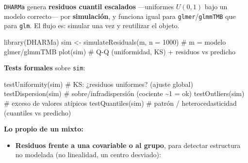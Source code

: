 \documentclass[
  letterpaper,
  DIV=11,
  numbers=noendperiod]{scrartcl}
\newenvironment{Shaded}{\begin{snugshade}}{\end{snugshade}}
\newcommand{\AttributeTok}[1]{\textcolor[rgb]{0.40,0.45,0.13}{#1}}
\newcommand{\CommentTok}[1]{\textcolor[rgb]{0.37,0.37,0.37}{#1}}
\newcommand{\DecValTok}[1]{\textcolor[rgb]{0.68,0.00,0.00}{#1}}
\newcommand{\FunctionTok}[1]{\textcolor[rgb]{0.28,0.35,0.67}{#1}}
\newcommand{\NormalTok}[1]{\textcolor[rgb]{0.00,0.23,0.31}{#1}}
\newcommand{\OtherTok}[1]{\textcolor[rgb]{0.00,0.23,0.31}{#1}}
\providecommand{\tightlist}{%
  \setlength{\itemsep}{0pt}\setlength{\parskip}{0pt}}\usepackage{longtable,booktabs,array}
\begin{document}
\begin{tcolorbox}[enhanced jigsaw, breakable, colframe=quarto-callout-tip-color-frame, left=2mm, arc=.35mm, colbacktitle=quarto-callout-tip-color!10!white, toprule=.15mm, colback=white, coltitle=black, rightrule=.15mm, opacitybacktitle=0.6, title=\textcolor{quarto-callout-tip-color}{\faLightbulb}\hspace{0.5em}{🔧 En R. Residuos simulados (DHARMa) en modelos mixtos}, titlerule=0mm, toptitle=1mm, bottomtitle=1mm, leftrule=.75mm, bottomrule=.15mm, opacityback=0]

\texttt{DHARMa} genera \textbf{residuos cuantil escalados} ---uniformes
\(U(0,1)\) bajo un modelo correcto--- por \textbf{simulación}, y
funciona igual para \texttt{glmer}/\texttt{glmmTMB} que para
\texttt{glm}. El flujo es: simular una vez y reutilizar el objeto.

\begin{Shaded}
\begin{Highlighting}[]
\FunctionTok{library}\NormalTok{(DHARMa)}
\NormalTok{sim }\OtherTok{\textless{}{-}} \FunctionTok{simulateResiduals}\NormalTok{(m, }\AttributeTok{n =} \DecValTok{1000}\NormalTok{)   }\CommentTok{\# m = modelo glmer/glmmTMB}
\FunctionTok{plot}\NormalTok{(sim)                                }\CommentTok{\# Q{-}Q (uniformidad, KS) + residuos vs predicho}
\end{Highlighting}
\end{Shaded}

\textbf{Tests formales} sobre \texttt{sim}:

\begin{Shaded}
\begin{Highlighting}[]
\FunctionTok{testUniformity}\NormalTok{(sim)     }\CommentTok{\# KS: ¿residuos uniformes? (ajuste global)}
\FunctionTok{testDispersion}\NormalTok{(sim)     }\CommentTok{\# sobre/infradispersión (cociente \textasciitilde{}1 = ok)}
\FunctionTok{testOutliers}\NormalTok{(sim)       }\CommentTok{\# exceso de valores atípicos}
\FunctionTok{testQuantiles}\NormalTok{(sim)      }\CommentTok{\# patrón / heterocedasticidad (cuantiles vs predicho)}
\end{Highlighting}
\end{Shaded}

\textbf{Lo propio de un mixto:}

\begin{itemize}
\tightlist
\item
  \textbf{Residuos frente a una covariable o al grupo}, para detectar
  estructura no modelada (no linealidad, un centro desviado):
\end{itemize}


\end{tcolorbox}
\end{document}
